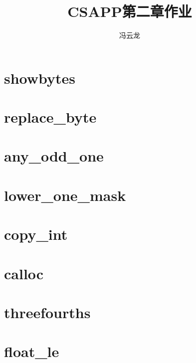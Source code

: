 \documentclass[11pt,a4paper]{ctexart}
\title{CSAPP第二章作业}
\author{冯云龙}
\begin{document}
\maketitle
\tableofcontents

\section{showbytes}


\section{replace\_byte}


\section{any\_odd\_one}


\section{lower\_one\_mask}


\section{copy\_int}


\section{calloc}


\section{threefourths}


\section{float\_le}

\end{document}
